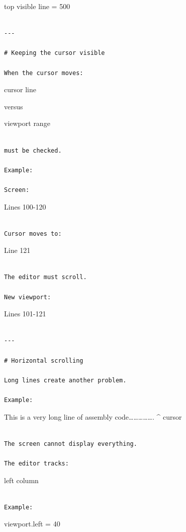 \documentclass[
  oneside,
  openany]{book}
\begin{document}
top visible line = 500

\begin{verbatim}

---

# Keeping the cursor visible

When the cursor moves:
\end{verbatim}

cursor line

versus

viewport range

\begin{verbatim}

must be checked.

Example:

Screen:
\end{verbatim}

Lines 100-120

\begin{verbatim}

Cursor moves to:
\end{verbatim}

Line 121

\begin{verbatim}

The editor must scroll.

New viewport:
\end{verbatim}

Lines 101-121

\begin{verbatim}

---

# Horizontal scrolling

Long lines create another problem.

Example:
\end{verbatim}

This is a very long line of assembly code\ldots\ldots\ldots\ldots\ldots.
\^{} cursor

\begin{verbatim}

The screen cannot display everything.

The editor tracks:
\end{verbatim}

left column

\begin{verbatim}

Example:
\end{verbatim}

viewport.left = 40
\end{document}
